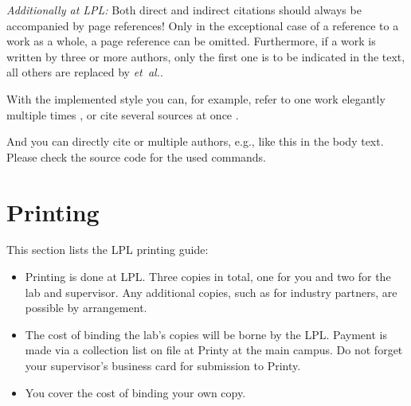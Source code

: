 \emph{Additionally at LPL:} Both direct and indirect citations should always be accompanied by page references! Only in the exceptional case of a reference to a work as a whole, a page reference can be omitted. Furthermore, if a work is written by three or more authors, only the first one is to be indicated in the text, all others are replaced by \emph{et\ al.}.

With the implemented style you can, for example, refer to one work \autocite[2\psq]{zimmermann2013vehicle} elegantly multiple times \autocite[17]{zimmermann2013vehicle}, or cite several sources at once \autocites[42--69]{zimmermann2013computing}[15\psqq]{zimmermann2017design}.

And you can directly cite \textcite{zimmermann2013vehicle} or multiple authors, e.g., \textcites{zimmermann2017design}{Schlosser2014} like this in the body text. Please check the source code for the used commands. 


\section{Printing}
This section lists the LPL printing guide:

\begin{itemize}
	\item Printing is done at LPL. Three copies in total, one for you and two for the lab and supervisor. Any additional copies, such as for industry partners, are possible by arrangement. 
	\item The cost of binding the lab's copies will be borne by the LPL. Payment is made via a collection list on file at Printy at the main campus. Do not forget your supervisor's business card for submission to Printy.
	\item You cover the cost of binding your own copy.
\end{itemize}

\cleardoubleemptypage

